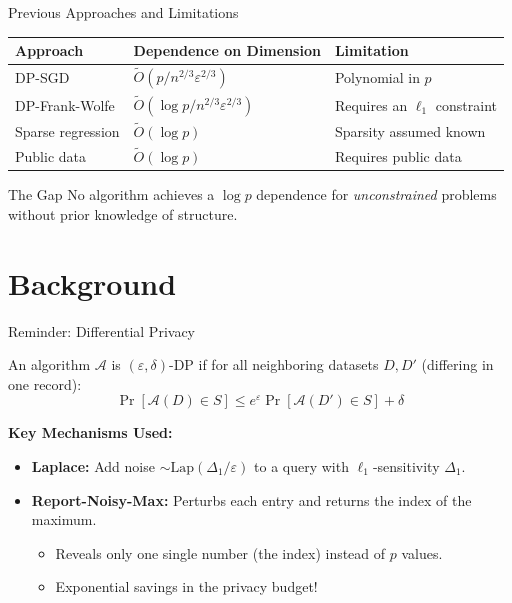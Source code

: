 \documentclass[10pt]{beamer}
\begin{document}
\begin{frame}{Previous Approaches and Limitations}
\begin{table}
\footnotesize
\begin{tabular}{@{}lll@{}}
\toprule
\textbf{Approach} & \textbf{Dependence on Dimension} & \textbf{Limitation} \\
\midrule
DP-SGD & $\tilde{O}(p / n^{2/3}\varepsilon^{2/3})$ & Polynomial in $p$ \\
DP-Frank-Wolfe & $\tilde{O}(\log p / n^{2/3}\varepsilon^{2/3})$ & Requires an $\ell_1$ constraint \\
Sparse regression & $\tilde{O}(\log p)$ & Sparsity assumed known \\
Public data & $\tilde{O}(\log p)$ & Requires public data \\
\bottomrule
\end{tabular}
\end{table}

\vspace{1em}
\begin{alertblock}{The Gap}
No algorithm achieves a $\log p$ dependence for \emph{unconstrained} problems without prior knowledge of structure.
\end{alertblock}
\end{frame}

\section{Background}

\begin{frame}{Reminder: Differential Privacy}
\begin{definition}
An algorithm $\mathcal{A}$ is $(\varepsilon, \delta)$-DP if for all neighboring datasets $D, D'$ (differing in one record):
\[
\Pr[\mathcal{A}(D) \in S] \leq e^\varepsilon \Pr[\mathcal{A}(D') \in S] + \delta
\]
\end{definition}

\vspace{1em}
\textbf{Key Mechanisms Used:}
\begin{itemize}
\item \textbf{Laplace:} Add noise $\sim \text{Lap}(\Delta_1 / \varepsilon)$ to a query with $\ell_1$-sensitivity $\Delta_1$.
\item \textbf{Report-Noisy-Max:} Perturbs each entry and returns the index of the maximum.
\begin{itemize}
\item Reveals only \alert{one single number} (the index) instead of $p$ values.
\item Exponential savings in the privacy budget!
\end{itemize}
\end{itemize}
\end{frame}
\end{document}
